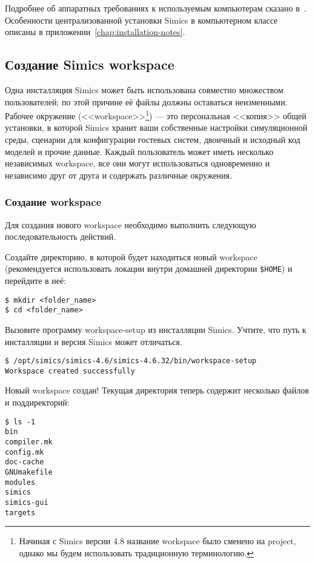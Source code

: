 Подробнее об аппаратных требованиях к используемым компьютерам сказано в~\cite{installation}. Особенности централизованной установки Simics в компьютерном классе описаны в приложении~\ref{chap:installation-notes}.

\subsection{Создание Simics workspace}

Одна инсталляция Simics может быть использована совместно множеством пользователей; по этой причине её файлы должны оставаться неизменными. Рабочее окружение (\abbr <<workspace>>\footnote{Начиная с Simics версии 4.8 название workspace было сменено на project, однако мы будем использовать традиционную терминологию.}) --- это персональная <<копия>> общей установки, в которой Simics хранит ваши собственные настройки симуляционной среды, сценарии для конфигурации гостевых систем, двоичный и исходный код моделей и прочие данные. Каждый пользователь может иметь несколько независимых workspace, все они могут использоваться одновременно и независимо друг от друга и содержать различные окружения.

\subsubsection{Создание workspace}

Для создания нового workspace необходимо выполнить следующую последовательность действий.

\begin{enumerate*}
    \item Создайте директорию, в которой будет находиться новый workspace (рекомендуется использовать локации внутри домашней директории \texttt{\$HOME}) и перейдите в неё:

\begin{lstlisting}
$ mkdir <folder_name>
$ cd <folder_name>
\end{lstlisting}
    \item Вызовите программу workspace-setup из инсталляции Simics. Учтите, что путь к инсталляции и версия Simics может отличаться.
\begin{lstlisting}
$ /opt/simics/simics-4.6/simics-4.6.32/bin/workspace-setup
Workspace created successfully
\end{lstlisting}
\end{enumerate*}

Новый workspace создан! Текущая директория теперь содержит несколько файлов и поддиректорий:
\begin{lstlisting}
$ ls -1
bin
compiler.mk
config.mk
doc-cache
GNUmakefile
modules
simics
simics-gui
targets
\end{lstlisting}



